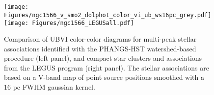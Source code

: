 \begin{figure}
\centering
\texttt{[image: Figures/ngc1566\_v\_smo2\_dolphot\_color\_vi\_ub\_ws16pc\_grey.pdf]}
\texttt{[image: Figures/ngc1566\_LEGUSall.pdf]}
 \caption{Comparison of UBVI color-color diagrams for multi-peak stellar associations identified with the PHANGS-HST watershed-based procedure (left panel), and compact star clusters and associations from the LEGUS program (right panel).  The stellar associations are based on a V-band map of point source positions smoothed with a 16 pc FWHM gaussian kernel.}
 \label{fig:ngc1566cc}
\end{figure}